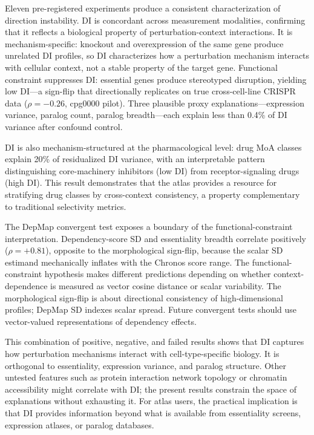 \documentclass[11pt]{article}
\begin{document}
Eleven pre-registered experiments produce a consistent characterization
of direction instability.  DI is concordant across measurement
modalities, confirming that it reflects a biological property of
perturbation-context interactions.  It is mechanism-specific: knockout
and overexpression of the same gene produce unrelated DI profiles, so DI
characterizes how a perturbation mechanism interacts with cellular
context, not a stable property of the target gene.  Functional
constraint suppresses DI: essential genes produce stereotyped disruption,
yielding low DI---a sign-flip that directionally replicates on true
cross-cell-line CRISPR data ($\rho = -0.26$, cpg0000 pilot).  Three
plausible proxy explanations---expression variance, paralog count,
paralog breadth---each explain less than 0.4\% of DI variance after
confound control.

DI is also mechanism-structured at the pharmacological level: drug MoA
classes explain 20\% of residualized DI variance, with an interpretable
pattern distinguishing core-machinery inhibitors (low DI) from
receptor-signaling drugs (high DI).  This result demonstrates that the
atlas provides a resource for stratifying drug classes by cross-context
consistency, a property complementary to traditional selectivity
metrics.

The DepMap convergent test exposes a boundary of the
functional-constraint interpretation.  Dependency-score SD and
essentiality breadth correlate positively ($\rho = +0.81$), opposite to
the morphological sign-flip, because the scalar SD estimand mechanically
inflates with the Chronos score range.  The functional-constraint
hypothesis makes different predictions depending on whether
context-dependence is measured as vector cosine distance or scalar
variability.  The morphological sign-flip is about directional
consistency of high-dimensional profiles; DepMap SD indexes scalar
spread.  Future convergent tests should use vector-valued representations
of dependency effects.

This combination of positive, negative, and failed results shows that DI
captures how perturbation mechanisms interact with
cell-type-specific biology.  It is orthogonal to essentiality,
expression variance, and paralog structure.  Other untested features
such as protein interaction network topology or chromatin accessibility
might correlate with DI; the present results constrain the space of
explanations without exhausting it.  For atlas users, the practical
implication is that DI provides information beyond what is available
from essentiality screens, expression atlases, or paralog databases.
\end{document}

